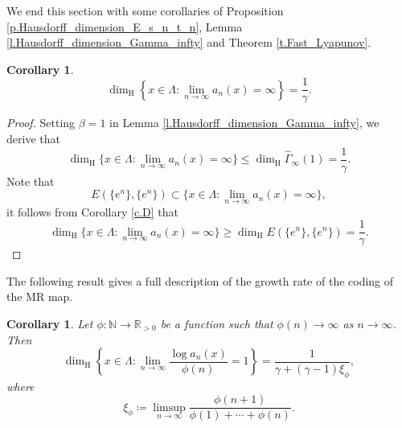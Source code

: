 \documentclass[12pt,reqno]{amsart}
\renewcommand{\=}{\coloneqq}
\theoremstyle{plain}
\newtheorem{cor}[theorem]{Corollary}
\begin{document}
We end this section with some corollaries of Proposition \ref{p.Hausdorff_dimension_E_s_n_t_n}, Lemma \ref{l.Hausdorff_dimension_Gamma_infty} and Theorem \ref{t.Fast_Lyapunov}.

\begin{cor}\label{c.Hausdorff_dim_F}
        \begin{equation*}
                \dim_{\mathrm{H}}
                \left\{x\in \Lambda:\lim_{n \to \infty}
                a_n(x)=\infty\right\}
                =\frac{1}{\gamma}.
        \end{equation*}
\end{cor}

\begin{proof}
        Setting $\beta =1$ in Lemma \ref{l.Hausdorff_dimension_Gamma_infty}, we derive that
        \begin{equation*}
                \dim_{\mathrm{H}}\{x\in \Lambda:\lim_{n \to \infty}
                a_n(x)=\infty\}
                \leq \dim_{\mathrm{H}}\widehat{\Gamma}_{\infty}(1)=\frac{1}{\gamma}.
        \end{equation*}
Note that
        \begin{equation*}
         E(\{e^n\}, \{e^n\})
        \subset \{x\in \Lambda:\lim_{n \to \infty}
        a_n(x)=\infty\},
        \end{equation*}
 it follows from Corollary \ref{c.D} that
        \begin{equation*}
        \dim_{\mathrm{H}}\{x\in \Lambda:\lim_{n \to \infty}
        a_n(x)=\infty\}\geq
        \dim_{\mathrm{H}}
       E(\{e^n\},\{e^n\}) =\frac{1}{\gamma}.
        \end{equation*}
 \end{proof}



The following result gives a full description of the growth rate of the coding of the MR map.

\begin{cor}\label{c.growth_rate}
Let $\phi : \mathbb{N} \to \mathbb{R}_{>0}$ be a function such that $\phi(n) \to \infty$ as $n \to \infty$. Then
        \begin{equation}\label{e.growth_rate}
                \dim_{\mathrm{H}}
                \left\{x\in  \Lambda:\lim_{n\to \infty }
                \frac{\log a_n(x)}{\phi(n)}=1\right\}
                =\frac{1}{\gamma+(\gamma-1)\xi_\phi},
        \end{equation}
        where
        \begin{equation*}
                \xi_\phi\coloneqq \limsup_{n \to \infty}
                \frac{\phi(n+1)}{\phi(1)+\cdots+\phi(n)}.
        \end{equation*}
\end{cor}
\end{document}
